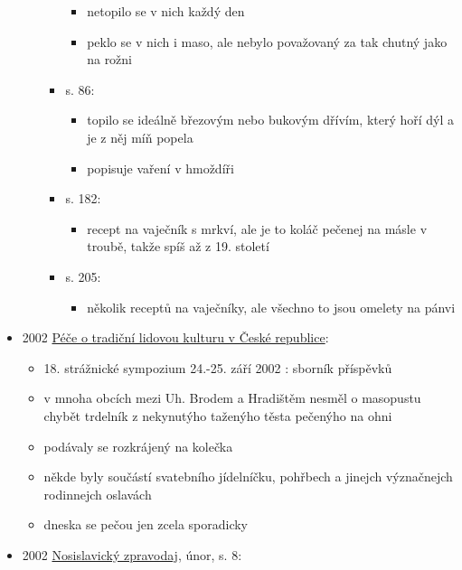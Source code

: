 \begin{itemize}
\begin{itemize}
\begin{itemize}
      \begin{itemize}
      \tightlist
      \item
        netopilo se v nich každý den
      \item
        peklo se v nich i maso, ale nebylo považovaný za tak chutný jako
        na rožni
      \end{itemize}
    \item
      s. 86:

      \begin{itemize}
      \tightlist
      \item
        topilo se ideálně březovým nebo bukovým dřívím, který hoří dýl a
        je z něj míň popela
      \item
        popisuje vaření v hmoždíři
      \end{itemize}
    \item
      s. 182:

      \begin{itemize}
      \tightlist
      \item
        recept na vaječník s mrkví, ale je to koláč pečenej na másle v
        troubě, takže spíš až z 19. století
      \end{itemize}
    \item
      s. 205:

      \begin{itemize}
      \tightlist
      \item
        několik receptů na vaječníky, ale všechno to jsou omelety na
        pánvi
      \end{itemize}
    \end{itemize}
  \end{itemize}
\item
  2002
  \href{https://www.digitalniknihovna.cz/nulk/uuid/uuid:f582cd95-65fe-4d23-b7a5-29f879aeeab3}{Péče
  o tradiční lidovou kulturu v České republice}:

  \begin{itemize}
  \tightlist
  \item
    18. strážnické sympozium 24.-25. září 2002 : sborník příspěvků
  \item
    v mnoha obcích mezi Uh. Brodem a Hradištěm nesměl o masopustu chybět
    trdelník z nekynutýho taženýho těsta pečenýho na ohni
  \item
    podávaly se rozkrájený na kolečka
  \item
    někde byly součástí svatebního jídelníčku, pohřbech a jinejch
    význačnejch rodinnejch oslavách
  \item
    dneska se pečou jen zcela sporadicky
  \end{itemize}
\item
  2002
  \href{https://www.nosislav.cz/assets/File.ashx?id_org=10486&id_dokumenty=1709}{Nosislavický
  zpravodaj}, únor, s. 8:


\end{itemize}
